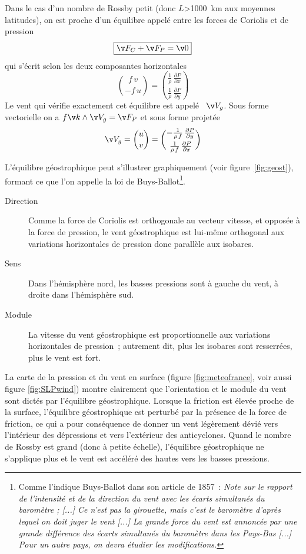 \sk
Dans le cas d'un nombre de Rossby petit (donc $L$>1000~km aux moyennes latitudes), on est proche d'un équilibre appelé  entre les forces de Coriolis et de pression
\[ \boxed{ \v F_C+\v F_P=\v 0 } \]
qui s'écrit selon les deux composantes horizontales
\[ \boxed{ \binom{f \, v}{-f \, u} = \binom{\frac{1}{\rho} \,\frac{\partial P}{\partial x}}{\frac{1}{\rho} \,\frac{\partial P}{\partial y}} } \]
Le vent qui vérifie exactement cet équilibre est appelé ~$\v V_g$. Sous forme vectorielle on a $f\v k\wedge\v V_g=\v F_P$ et sous forme projetée
\[ \v V_g = \binom{u}{v} = \binom{- \frac{1}{\rho \, f} \, \frac{\partial P}{\partial y}}{\frac{1}{\rho \, f} \, \frac{\partial P}{\partial x}} \]


\sk
L'équilibre géostrophique peut s'illustrer graphiquement (voir figure~\ref{fig:geost}), formant ce que l'on appelle la loi de Buys-Ballot\footnote{Comme l'indique Buys-Ballot dans son article de 1857~: \emph{Note sur le rapport de l'intensité et de la direction du vent avec les écarts simultanés du baromètre ; [...] Ce n'est pas la girouette, mais c'est le baromètre d'après lequel on doit juger le vent [...] La grande force du vent est annoncée par une grande différence des écarts simultanés du baromètre dans les Pays-Bas [...] Pour un autre pays, on devra étudier les modifications.}}.
\begin{description}
\item[Direction] Comme la force de Coriolis est orthogonale au vecteur vitesse, et opposée à la force de pression, le vent géostrophique est lui-même orthogonal aux variations horizontales de pression donc parallèle aux isobares.
\item[Sens] Dans l'hémisphère nord, les basses pressions sont à gauche du vent, à droite dans l'hémisphère sud.
\item[Module] La vitesse du vent géostrophique est proportionnelle aux variations horizontales de pression~; autrement dit, plus les isobares sont resserrées, plus le vent est fort.
\end{description}
La carte de la pression et du vent en surface (figure \ref{fig:meteofrance}, voir aussi figure \ref{fig:SLPwind}) montre clairement que l'orientation et le module du vent sont dictés par l'équilibre géostrophique. Lorsque la friction est élevée proche de la surface, l'équilibre géostrophique est perturbé par la présence de la force de friction, ce qui a pour conséquence de donner un vent légèrement dévié vers l'intérieur des dépressions et vers l'extérieur des anticyclones. Quand le nombre de Rossby est grand (donc à petite échelle), l'équilibre géostrophique ne s'applique plus et le vent est accéléré des hautes vers les basses pressions. 

